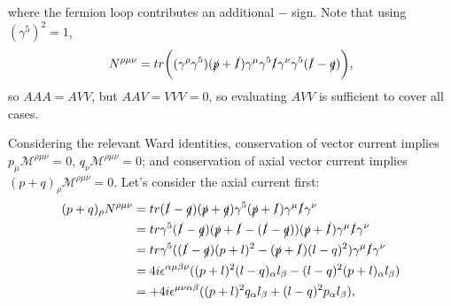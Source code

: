 where the fermion loop contributes an additional $-$ sign. Note that using $(\gamma^5)^2=1$,
\begin{equation}
N^{\rho \mu \nu} = tr\bigg((\gamma^\rho \gamma^5)(\slashed{p} + \slashed{l})\gamma^\mu \gamma^5 \slashed{l} \gamma^\nu \gamma^5 (\slashed{l} - \slashed{q})\bigg),
\end{equation}
so $AAA=AVV$, but $AAV=VVV=0$, so evaluating $AVV$ is sufficient to cover all cases. 

Considering the relevant Ward identities, conservation of vector current implies $p_\mu \mathcal{M}^{\rho \mu \nu}=0$, $q_\nu \mathcal{M}^{\rho \mu \nu}=0$; and conservation of axial vector current implies $(p+q)_\rho \mathcal{M}^{\rho \mu \nu} = 0$. Let's consider the axial current first:
\begin{equation}
\begin{split}
(p+q)_\rho N^{\rho \mu \nu} &=  tr(\slashed{l}-\slashed{q})(\slashed{p} + \slashed{q})\gamma^5(\slashed{p}+\slashed{l})\gamma^\mu \slashed{l} \gamma^\nu \\
&= tr \gamma^5(\slashed{l}-\slashed{q})(\slashed{p}+\slashed{l}-(\slashed{l}-\slashed{q}))(\slashed{p}+\slashed{l})\gamma^\mu \slashed{l} \gamma^\nu \\
&= tr \gamma^5((\slashed{l}-\slashed{q})(p+l)^2-(\slashed{p}+\slashed{l})(l-q)^2)\gamma^\mu \slashed{l} \gamma^\nu \\
&= 4i\epsilon^{\alpha \mu \beta \nu}((p+l)^2(l-q)_\alpha l_\beta - (l-q)^2(p+l)_\alpha l_\beta) \\
&= +4i\epsilon^{\mu \nu \alpha \beta}((p+l)^2 q_\alpha l_\beta + (l-q)^2 p_\alpha l_\beta),
\end{split}
\end{equation}
